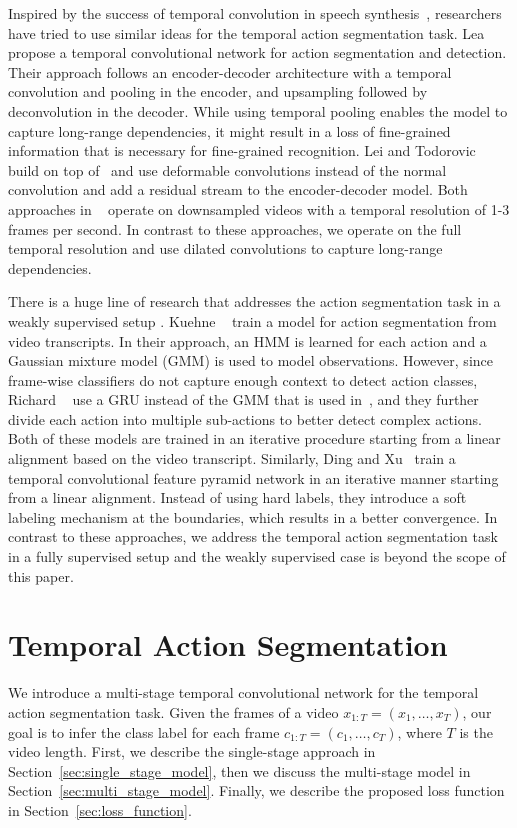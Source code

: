 \documentclass[10pt,twocolumn,letterpaper]{article}
\begin{document}
Inspired by the success of temporal convolution in speech synthesis~\cite{van2016wavenet}, 
researchers have tried to use similar ideas for the temporal action segmentation 
task. Lea \etal~\cite{Lea_2017_CVPR} propose a temporal convolutional network for action 
segmentation and detection. Their approach follows an encoder-decoder architecture with 
a temporal convolution and pooling in the encoder, and upsampling followed by deconvolution 
in the decoder. While using temporal pooling enables the model to capture long-range dependencies, 
it might result in a loss of fine-grained information that is necessary for fine-grained recognition. 
Lei and Todorovic~\cite{lei2018temporal} build on top of~\cite{Lea_2017_CVPR} and use deformable 
convolutions instead of the normal convolution and add a residual stream to the encoder-decoder model. 
Both approaches in ~\cite{Lea_2017_CVPR, lei2018temporal} operate on downsampled videos with 
a temporal resolution of 1-3 frames per second.
In contrast to these approaches, we operate on the full temporal resolution and 
use dilated convolutions to capture long-range dependencies.

There is a huge line of research that addresses the action segmentation task in 
a weakly supervised setup \cite{bojanowski2014weakly, huang2016connectionist, kuehne2017weakly, 
richard2017weakly, ding2018weakly}. 
Kuehne \etal~\cite{kuehne2017weakly} train a model for action segmentation from 
video transcripts. In their approach, an HMM is learned for each action and a Gaussian 
mixture model (GMM) is used to model observations. However, since frame-wise classifiers 
do not capture enough context to detect action classes, Richard \etal~\cite{richard2017weakly} 
use a GRU instead of the GMM that is used in~\cite{kuehne2017weakly}, and they further 
divide each action into multiple sub-actions to better detect complex actions. 
Both of these models are trained in an iterative procedure starting from a linear alignment 
based on the video transcript. Similarly, Ding and Xu~\cite{ding2018weakly} train a temporal 
convolutional feature pyramid network in an iterative manner starting from a linear alignment. 
Instead of using hard labels, they introduce a soft labeling mechanism at the 
boundaries, which results in a better convergence. In contrast to these approaches, we address 
the temporal action segmentation task in a fully supervised setup and the weakly 
supervised case is beyond the scope of this paper.

\section{Temporal Action Segmentation}
We introduce a multi-stage temporal convolutional network for the temporal
action segmentation task. Given the frames of a video 
$x_{1:T} = (x_1,\dots,x_T)$, our goal is to infer the class label for 
each frame $c_{1:T} = (c_1,\dots,c_T)$, where $T$ is the video length.  
First, we describe the single-stage approach in 
Section~\ref{sec:single_stage_model}, then we discuss the multi-stage 
model in Section~\ref{sec:multi_stage_model}. Finally, we describe the 
proposed loss function in Section~\ref{sec:loss_function}.
 
\end{document}
